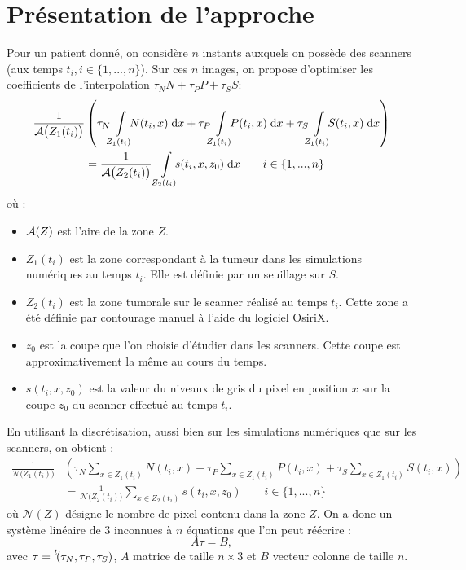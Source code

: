\documentclass[main.tex]{subfiles}
\begin{document}
\section{Présentation de l'approche}
Pour un patient donné, on considère $n$ instants auxquels on possède des scanners (aux temps $t_i, i\in \{ 1,...,n \}$). Sur ces $n$ images, on propose d'optimiser les coefficients de l'interpolation $\tau_N N + \tau_P P + \tau_S S$:
\begin{equation}
\label{eq:optim_grey_integ_aire}
\begin{aligned}
\frac{1}{\aire\big(Z_1(t_i)\big)}&\left( \tau_N\intperso{Z_1(t_i)}N(t_i,x) \dx + \tau_P\intperso{Z_1(t_i)}P(t_i,x) \dx + \tau_S\intperso{Z_1(t_i)} S(t_i,x) \dx \right) \\
&= \frac{1}{\aire\big(Z_2(t_i)\big)} \ \intperso{Z_2(t_i)} s(t_i,x,z_0) \dx \qquad i \in \{1,...,n\}
\end{aligned}
\end{equation}
où : \begin{itemize}
\item $\mathcal{A}(Z)$ est l'aire de la zone $Z$.
\item $Z_1(t_i)$ est la zone correspondant à la tumeur dans les simulations numériques au temps $t_i$. Elle est définie par un seuillage sur $S$.
\item $Z_2(t_i)$ est la zone tumorale sur le scanner réalisé au temps $t_i$. Cette zone a été définie par contourage manuel à l'aide du logiciel OsiriX.
\item $z_0$ est la coupe que l'on choisie d'étudier dans les scanners. Cette coupe est approximativement la même au cours du temps.
\item $s(t_i,x,z_0)$ est la valeur du niveaux de gris du pixel en position $x$ sur la coupe $z_0$ du scanner effectué au temps $t_i$.
\end{itemize}
En utilisant la discrétisation, aussi bien sur les simulations numériques que sur les scanners, on obtient :
\begin{equation}
\label{eq:optim_grey_eq_discr}
\begin{aligned}
\frac{1}{\mathcal{N}\big(Z_1(t_i)\big)}&\left( \tau_N\!\!\sum_{x\in Z_1(t_i)}\!\!N(t_i,x) + \tau_P\!\!\sum_{x\in Z_1(t_i)}\!\!P(t_i,x) + \tau_S\!\!\sum_{x\in Z_1(t_i)}\!\!S(t_i,x) \right) \\
&= \frac{1}{\mathcal{N}\big(Z_2(t_i)\big)} \sum_{x\in Z_2(t_i)}\!\! s(t_i,x,z_0) \qquad i \in \{1,...,n\}
\end{aligned}
\end{equation}
où $\mathcal{N}(Z)$ désigne le nombre de pixel contenu dans la zone $Z$. On a donc un système linéaire de 3 inconnues à $n$ équations que l'on peut réécrire :
\begin{equation}
A\tau=B,
\end{equation}
avec $\tau= \prescript{\mathit{t\!}}{}{(}\tau_N,\tau_P,\tau_S)$, $A$ matrice de taille $n\times 3$ et $B$ vecteur colonne de taille $n$.
\end{document}
